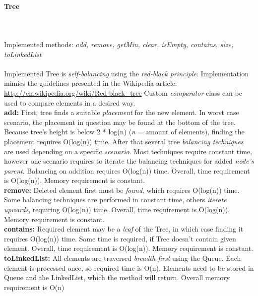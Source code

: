 \documentclass[a4paper,12pt]{article}
\begin{document}
\paragraph{\large Tree} \hspace{0pt} \\
\\
Implemented methods: \emph{add, remove, getMin, clear, isEmpty, contains, size, toLinkedList}\\
\\
Implemented Tree is \emph{self-balancing} using the \emph{red-black principle}. Implementation mimics the guidelines presented in the Wikipedia article: \url{http://en.wikipedia.org/wiki/Red-black_tree} Custom \emph{comparator} class can be used to compare elements in a desired way.\\

\textbf{add:} First, tree finds a suitable \emph{placement} for the new element. In worst case scenario, the placement in question may be found at the bottom of the tree. Because tree's height is below 2 * log(n) (\emph{n} = amount of elements), finding the placement requires O(log(n)) time. After that several tree \emph{balancing techniques} are used depending on a specific \emph{scenario}. Most techniques require constant time, however one scenario requires to iterate the balancing techniques for added \emph{node's parent}. Balancing on addition requires O(log(n)) time. Overall, time requirement is O(log(n)). Memory requirement is constant.
\\

\textbf{remove:} Deleted element first must be \emph{found}, which requires O(log(n)) time. Some balancing techniques are performed in constant time, others \emph{iterate upwards}, requiring O(log(n)) time.  Overall, time requirement is O(log(n)). Memory requirement is constant.
\\

\textbf{contains:} Required element may be a \emph{leaf} of the Tree, in which case finding it requires O(log(n)) time. Same time is required, if Tree doesn't contain given element. Overall, time requirement is O(log(n)). Memory requirement is constant.
\\

\textbf{toLinkedList:} All elements are traversed \emph{breadth first} using the Queue. Each element is processed once, so required time is O(n). Elements need to be stored in Queue and the LinkedList, which the method will return. Overall memory requirement is O(n)
\\
\end{document}
